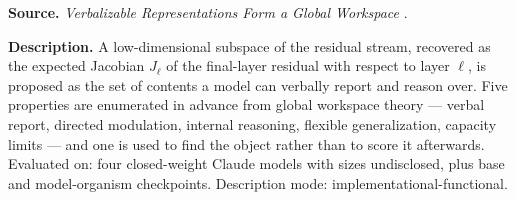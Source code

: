 
\textbf{Source.} \emph{Verbalizable Representations Form a Global Workspace} \citep{gurnee2026verbalizable}.

\textbf{Description.} A low-dimensional subspace of the residual stream, recovered as the expected Jacobian $J_\ell$ of the final-layer residual with respect to layer $\ell$, is proposed as the set of contents a model can verbally report and reason over. Five properties are enumerated in advance from global workspace theory --- verbal report, directed modulation, internal reasoning, flexible generalization, capacity limits --- and one is used to find the object rather than to score it afterwards. Evaluated on: four closed-weight Claude models with sizes undisclosed, plus base and model-organism checkpoints. Description mode: implementational-functional.

